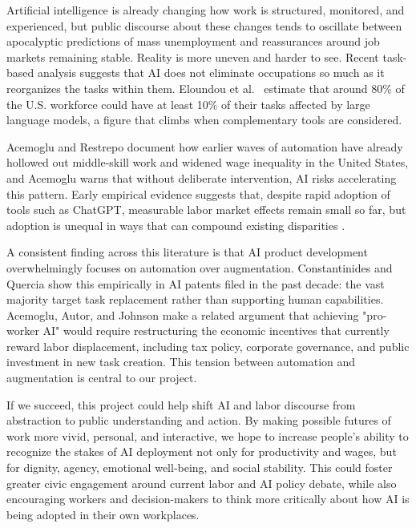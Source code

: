 \documentclass[sigconf,authordraft]{acmart}
\begin{document}
Artificial intelligence is already changing how work is structured, monitored, and experienced, but public discourse about these changes tends to oscillate between apocalyptic predictions of mass unemployment and reassurances around job markets remaining stable. Reality is more uneven and harder to see. Recent task-based analysis suggests that AI does not eliminate occupations so much as it reorganizes the tasks within them. Eloundou et al.~\cite{eloundou2024gpts} estimate that around 80\% of the U.S. workforce could have at least 10\% of their tasks affected by large language models, a figure that climbs when complementary tools are considered.

Acemoglu and Restrepo \cite{acemoglu2022tasks} document how earlier waves of automation have already hollowed out middle-skill work and widened wage inequality in the United States, and Acemoglu \cite{acemoglu2025simple} warns that without deliberate intervention, AI risks accelerating this pattern. Early empirical evidence suggests that, despite rapid adoption of tools such as ChatGPT, measurable labor market effects remain small so far, but adoption is unequal in ways that can compound existing disparities \cite{humlum2025llm}.

A consistent finding across this literature is that AI product development overwhelmingly focuses on automation over augmentation. Constantinides and Quercia \cite{constantinides2025ai} show this empirically in AI patents filed in the past decade: the vast majority target task replacement rather than supporting human capabilities. Acemoglu, Autor, and Johnson \cite{acemoglu2023proworker} make a related argument that achieving "pro-worker AI" would require restructuring the economic incentives that currently reward labor displacement, including tax policy, corporate governance, and public investment in new task creation. This tension between automation and augmentation is central to our project.

If we succeed, this project could help shift AI and labor discourse from abstraction to public understanding and action. By making possible futures of work more vivid, personal, and interactive, we hope to increase people's ability to recognize the stakes of AI deployment not only for productivity and wages, but for dignity, agency, emotional well-being, and social stability. This could foster greater civic engagement around current labor and AI policy debate, while also encouraging workers and decision-makers to think more critically about how AI is being adopted in their own workplaces.
\end{document}
